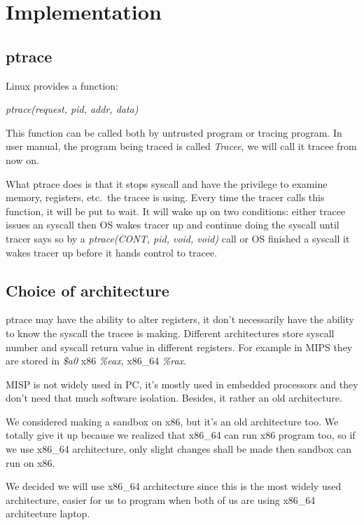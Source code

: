 \documentclass[conference,compsoc]{IEEEtran}
\begin{document}
\section{Implementation}
	\subsection{ptrace}
		\par
			Linux provides a function:\\
				\begin{center}
				\emph{ptrace(request, pid, addr, data)}
				\end{center}
			This function can be called both by untrusted program or tracing program. 
			In user manual, the program being traced is called \emph{Tracee}, we will call it tracee from now on.
		\par 
			What ptrace does is that it stops syscall and have the privilege to examine memory, registers, etc.\ the tracee is using. 
			Every time the tracer calls this function, it will be put to wait. 
			It will wake up on two conditions: either tracee issues an syscall then OS wakes tracer up and continue doing the syscall until tracer says so by a \emph{ptrace(CONT, pid, void, void)} call or OS finished a syscall it wakes tracer up before it hands control to tracee.
	\subsection{Choice of architecture}
		\par
			ptrace may have the ability to alter registers, it don't necessarily have the ability to know the syscall the tracee is making. 
			Different architectures store syscall number and syscall return value in different registers. 
			For example in MIPS they are stored in \emph{\$a0} x86 \emph{\%eax}, x86\_64 \emph{\%rax}.
		\par
			MISP is not widely used in PC, it's mostly used in embedded processors and they don't need that much software isolation. 
			Besides, it rather an old architecture.
		\par 
			We considered making a sandbox on x86, but it's an old architecture too. 
			We totally give it up because we realized that x86\_64 can run x86 program too, so if we use x86\_64 architecture, only slight changes shall be made then sandbox can run on x86.
		\par 
			We decided we will use x86\_64 architecture since this is the most widely used architecture, easier for us to program when both of us are using x86\_64 architecture laptop.
\end{document}
